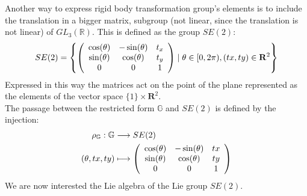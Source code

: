 Another way to express rigid body transformation group's elements is to include the translation in a bigger matrix, subgroup (not linear, since the translation is not linear) of $GL_3 (\mathbb{R})$. This is defined as the group $SE(2)$:
\begin{align*}
SE(2) = 
\left \{
\left (
\begin{array} {c c c }
\cos(\theta) & - \sin(\theta)& t_{x} \\
\sin(\theta) & \cos(\theta) & t_{y}\\
0 & 0 &  1
\end{array}
\right )
\mid
\theta \in  [0, 2\pi), (tx, ty) \in\mathbf{R}^2
\right \}
\end{align*}
Expressed in this way the matrices act on the point of the plane represented as the elements of the vector space $\{1 \} \times \mathbf{R}^2$.\\ 
The passage between the restricted form $\mathbb{G} $ and $SE(2)$ is defined by the injection:
\begin{align*}
\rho_{\mathbb{G}} : \mathbb{G} &\longrightarrow   SE(2)\\
(\theta, tx, ty) 
& \longmapsto
\left (
\begin{array} {c c c }
\cos(\theta) & - \sin(\theta)& tx \\
\sin(\theta) & \cos(\theta) & ty\\
0 & 0 &  1
\end{array}
\right )
\end{align*}
We are now interested the Lie algebra of the Lie group $SE(2)$. 
